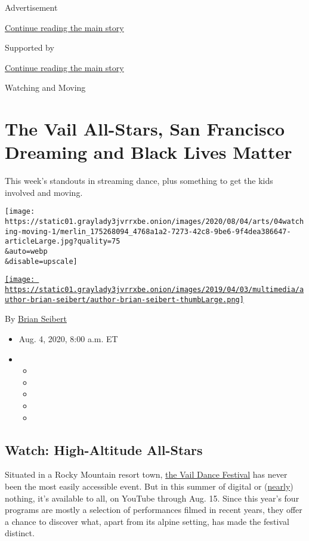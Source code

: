 Advertisement

\protect\hyperlink{after-top}{Continue reading the main story}

Supported by

\protect\hyperlink{after-sponsor}{Continue reading the main story}

Watching and Moving

\hypertarget{the-vail-all-stars-san-francisco-dreaming-and-black-lives-matter}{%
\section{The Vail All-Stars, San Francisco Dreaming and Black Lives
Matter}\label{the-vail-all-stars-san-francisco-dreaming-and-black-lives-matter}}

This week's standouts in streaming dance, plus something to get the kids
involved and moving.

\texttt{[image: https://static01.graylady3jvrrxbe.onion/images/2020/08/04/arts/04watching-moving-1/merlin\_175268094\_4768a1a2-7273-42c8-9be6-9f4dea386647-articleLarge.jpg?quality=75\\\&auto=webp\\\&disable=upscale]}

\href{https://www.nytimes3xbfgragh.onion/by/brian-seibert}{\texttt{[image: https://static01.graylady3jvrrxbe.onion/images/2019/04/03/multimedia/author-brian-seibert/author-brian-seibert-thumbLarge.png]}}

By \href{https://www.nytimes3xbfgragh.onion/by/brian-seibert}{Brian
Seibert}

\begin{itemize}
\item
  Aug. 4, 2020, 8:00 a.m. ET
\item
  \begin{itemize}
  \item
  \item
  \item
  \item
  \item
  \end{itemize}
\end{itemize}

\hypertarget{watch-high-altitude-all-stars}{%
\subsection{Watch: High-Altitude
All-Stars}\label{watch-high-altitude-all-stars}}

Situated in a Rocky Mountain resort town,
\href{https://vaildance.org/}{the Vail Dance Festival} has never been
the most easily accessible event. But in this summer of digital or
(\href{https://www.nytimes3xbfgragh.onion/2020/07/29/arts/dance/kaatsbaan-dance-festival-stella-abrera.html}{nearly})
nothing, it's available to all, on YouTube through Aug. 15. Since this
year's four programs are mostly a selection of performances filmed in
recent years, they offer a chance to discover what, apart from its
alpine setting, has made the festival distinct.

